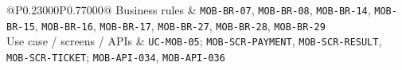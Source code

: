 \begin{longtable}{@{}P{0.23000\SRSWidth}P{0.77000\SRSWidth}@{}}
Business rules & \texttt{MOB-\allowbreak{}BR-\allowbreak{}07}, \texttt{MOB-\allowbreak{}BR-\allowbreak{}08}, \texttt{MOB-\allowbreak{}BR-\allowbreak{}14}, \texttt{MOB-\allowbreak{}BR-\allowbreak{}15}, \texttt{MOB-\allowbreak{}BR-\allowbreak{}16}, \texttt{MOB-\allowbreak{}BR-\allowbreak{}17}, \texttt{MOB-\allowbreak{}BR-\allowbreak{}27}, \texttt{MOB-\allowbreak{}BR-\allowbreak{}28}, \texttt{MOB-\allowbreak{}BR-\allowbreak{}29} \\[3pt]
Use case /\allowbreak{} screens /\allowbreak{} APIs & \texttt{UC-\allowbreak{}MOB-\allowbreak{}05}; \texttt{MOB-\allowbreak{}SCR-\allowbreak{}PAYMENT}, \texttt{MOB-\allowbreak{}SCR-\allowbreak{}RESULT}, \texttt{MOB-\allowbreak{}SCR-\allowbreak{}TICKET}; \texttt{MOB-\allowbreak{}API-\allowbreak{}034}, \texttt{MOB-\allowbreak{}API-\allowbreak{}036} \\[3pt]
\end{longtable}
\endgroup

